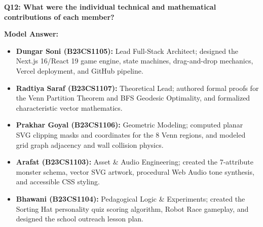 \documentclass[11pt,a4paper]{article}
\theoremstyle{definition}
\begin{document}
\begin{vivabox}
\textbf{Q12: What were the individual technical and mathematical contributions of each member?}

\textbf{Model Answer:}
\begin{itemize}
  \item \textbf{Dungar Soni (B23CS1105):} Lead Full-Stack Architect; designed the Next.js 16/React 19 game engine, state machines, drag-and-drop mechanics, Vercel deployment, and GitHub pipeline.
  \item \textbf{Radtiya Saraf (B23CS1107):} Theoretical Lead; authored formal proofs for the Venn Partition Theorem and BFS Geodesic Optimality, and formalized characteristic vector mathematics.
  \item \textbf{Prakhar Goyal (B23CS1106):} Geometric Modeling; computed planar SVG clipping masks and coordinates for the 8 Venn regions, and modeled grid graph adjacency and wall collision physics.
  \item \textbf{Arafat (B23CS1103):} Asset & Audio Engineering; created the 7-attribute monster schema, vector SVG artwork, procedural Web Audio tone synthesis, and accessible CSS styling.
  \item \textbf{Bhawani (B23CS1104):} Pedagogical Logic & Experiments; created the Sorting Hat personality quiz scoring algorithm, Robot Race gameplay, and designed the school outreach lesson plan.
\end{itemize}
\end{vivabox}
\end{document}
